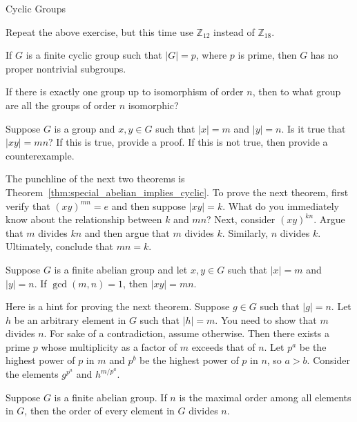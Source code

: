 \begin{section}{Cyclic Groups}
\begin{problem}
Repeat the above exercise, but this time use $\mathbb{Z}_{12}$ instead of $\mathbb{Z}_{18}$.
\end{problem}

\begin{corollary}
If $G$ is a finite cyclic group such that $|G|=p$, where $p$ is prime, then $G$ has no proper nontrivial subgroups.
\end{corollary}

\begin{problem}
If there is exactly one group up to isomorphism of order $n$, then to what group are all the groups of order $n$ isomorphic?
\end{problem}

\begin{problem}
Suppose $G$ is a group and $x,y\in G$ such that $|x|=m$ and $|y|=n$. Is it true that $|xy|=mn$?  If this is true, provide a proof.  If this is not true, then provide a counterexample.
\end{problem}

The punchline of the next two theorems is Theorem~\ref{thm:special_abelian_implies_cyclic}. To prove the next theorem,  first verify that $(xy)^{mn}=e$ and then suppose $|xy|=k$. What do you immediately know about the relationship between $k$ and $mn$? Next, consider $(xy)^{kn}$. Argue that $m$ divides $kn$ and then argue that $m$ divides $k$. Similarly, $n$ divides $k$. Ultimately, conclude that $mn=k$.

\begin{theorem}
Suppose $G$ is a finite abelian group and let $x,y\in G$ such that $|x|=m$ and $|y|=n$. If $\gcd(m,n)=1$, then $|xy|=mn$.
\end{theorem}

Here is a hint for proving the next theorem. Suppose $g\in G$ such that $|g|=n$. Let $h$ be an arbitrary element in $G$ such that $|h|=m$. You need to show that $m$ divides $n$. For sake of a contradiction, assume otherwise. Then there exists a prime $p$ whose multiplicity as a factor of $m$ exceeds that of $n$. Let $p^a$ be the highest power of $p$ in $m$ and $p^b$ be the highest power of $p$ in $n$, so $a>b$. Consider the elements $g^{p^a}$ and $h^{m/p^a}$.

\begin{theorem}
Suppose $G$ is a finite abelian group. If $n$ is the maximal order among all elements in $G$, then the order of every element in $G$ divides $n$.
\end{theorem}


\end{section}
